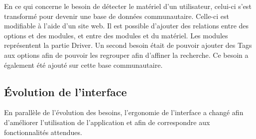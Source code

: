 \documentclass[16pts]{report}
\begin{document}
En ce qui concerne le besoin de détecter le matériel d'un utilisateur, celui-ci 
s'est transformé pour devenir une base de données communautaire. Celle-ci est 
modifiable à l'aide d'un site web. Il est possible d'ajouter des relations 
entre des options et des modules, et entre des modules et du matériel. Les 
modules représentent la partie Driver. Un second besoin était de pouvoir 
ajouter des Tags aux options afin de pouvoir les regrouper afin d'affiner la 
recherche. Ce besoin a également été ajouté sur cette base communautaire.

        \subsection{Évolution de l'interface}
        \label{sub:Évolution de l'interface}

En parallèle de l'évolution des besoins, l'ergonomie de l'interface a changé 
afin d'améliorer l'utilisation de l'application et afin de correspondre aux 
fonctionnalités attendues.
\end{document}
